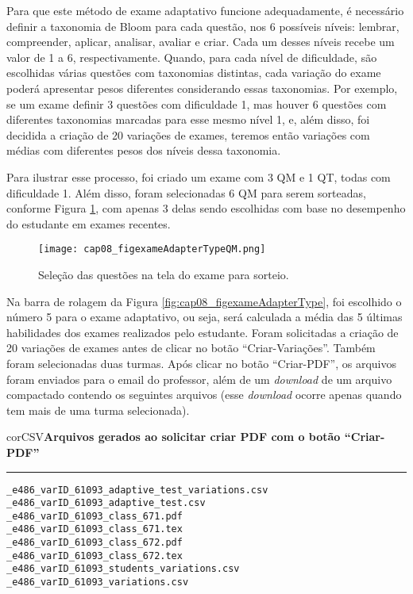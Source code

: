 Para que este método de exame adaptativo funcione adequadamente, é necessário definir a taxonomia de Bloom para cada questão, nos 6 possíveis níveis: lembrar, compreender, aplicar, analisar, avaliar e criar. Cada um desses níveis recebe um valor de 1 a 6, respectivamente. Quando, para cada nível de dificuldade, são escolhidas várias questões com taxonomias distintas, cada variação do exame poderá apresentar pesos diferentes considerando essas taxonomias. Por exemplo, se um exame definir 3 questões com dificuldade 1, mas houver 6 questões com diferentes taxonomias marcadas para esse mesmo nível 1, e, além disso, foi decidida a criação de 20 variações de exames, teremos então variações com médias com diferentes pesos dos níveis dessa taxonomia.


Para ilustrar esse processo, foi criado um exame com 3 QM e 1 QT, todas com dificuldade 1. Além disso, foram selecionadas 6 QM para serem sorteadas, conforme Figura \ref{fig:cap08_figexameAdapterTypeQM}, com apenas 3 delas sendo escolhidas com base no desempenho do estudante em exames recentes. 

\begin{figure}[!ht]
  \centering
  \texttt{[image: cap08\_figexameAdapterTypeQM.png]}
  \caption{Seleção das questões na tela do exame para sorteio.}
  \label{fig:cap08_figexameAdapterTypeQM}
\end{figure}

Na barra de rolagem da Figura \ref{fig:cap08_figexameAdapterType}, foi escolhido o número 5 para o exame adaptativo, ou seja, será calculada a média das 5 últimas habilidades dos exames realizados pelo estudante. Foram solicitadas a criação de 20 variações de exames antes de clicar no botão ``Criar-Variações''. Também foram selecionadas duas turmas. Após clicar no botão ``Criar-PDF'', os arquivos foram enviados para o email do professor, além de um \textit{download} de um arquivo compactado contendo os seguintes arquivos  (esse \textit{download} ocorre apenas quando tem mais de uma turma selecionada).

\begin{myboxCode}{corCSV}{\textbf{Arquivos gerados ao solicitar criar PDF com o botão ``Criar-PDF''}}\vspace{3mm}
\hrule
\begin{verbatim}
_e486_varID_61093_adaptive_test_variations.csv
_e486_varID_61093_adaptive_test.csv
_e486_varID_61093_class_671.pdf
_e486_varID_61093_class_671.tex
_e486_varID_61093_class_672.pdf
_e486_varID_61093_class_672.tex
_e486_varID_61093_students_variations.csv
_e486_varID_61093_variations.csv
\end{verbatim}
\end{myboxCode}

